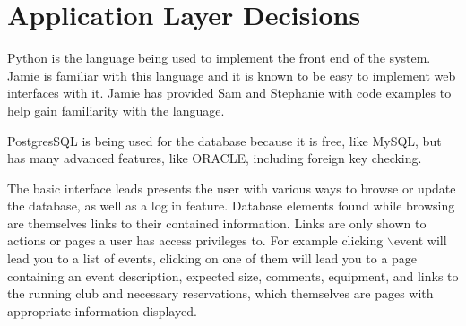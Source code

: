 \documentclass{article}
\begin{document}
\begin{comment}
\item SELECT COUNT(*) AS c, semail FROM reservation NATURAL JOIN student GROUP BY semail ORDER BY COUNT(*) DESC LIMIT 10
\item SELECT cemail FROM memberof WHERE semail=\%(email)s
\item SELECT data FROM sessions WHERE id=\%(id)s
\item SELECT email, aemail, super, semail, cemail FROM users LEFT OUTER JOIN
admin ON email = aEmail LEFT OUTER JOIN student ON email = sEmail LEFT OUTER
JOIN club ON email = cEmail WHERE email = \%(email)s
\item SELECT equipname FROM isIn WHERE roomnum=\%(room)s AND building=\%(building)s ORDER BY equipname
\item SELECT equipname FROM uses WHERE EID=\%(id)i ORDER BY equipname
\item SELECT major, COUNT(rid) AS count FROM ( (SELECT rid, major1 AS major FROM reservation NATURAL JOIN student) UNION (SELECT rid, major2 AS major FROM reservation NATURAL JOIN student WHERE major2 IS NOT NULL) ) AS counts GROUP BY major ORDER BY count DESC LIMIT 10
\item UPDATE sessions SET data=\%(data)s WHERE id=\%(id)s
\end{itemize}
\end{comment}


\section{Application Layer Decisions}
Python is the language being used to implement the front end of the system. Jamie is familiar with this language
and it is known to be easy to implement web interfaces with it. Jamie has provided Sam and Stephanie with code examples
to help gain familiarity with the language.

PostgresSQL is being used for the database because it is free, like MySQL, but has many advanced features, like ORACLE,
including foreign key checking.

The basic interface leads presents the user with various ways to browse or update the database, as well as a log in feature.
Database elements found while browsing are themselves links to their contained information.
Links are only shown to actions or pages a user has access privileges to.
For example clicking $\backslash$event will lead you to a list of events, clicking on one of them will lead you to a page containing
an event description, expected size, comments, equipment, and links to the running club and necessary reservations,
which themselves are pages with appropriate information displayed.
\end{document}
